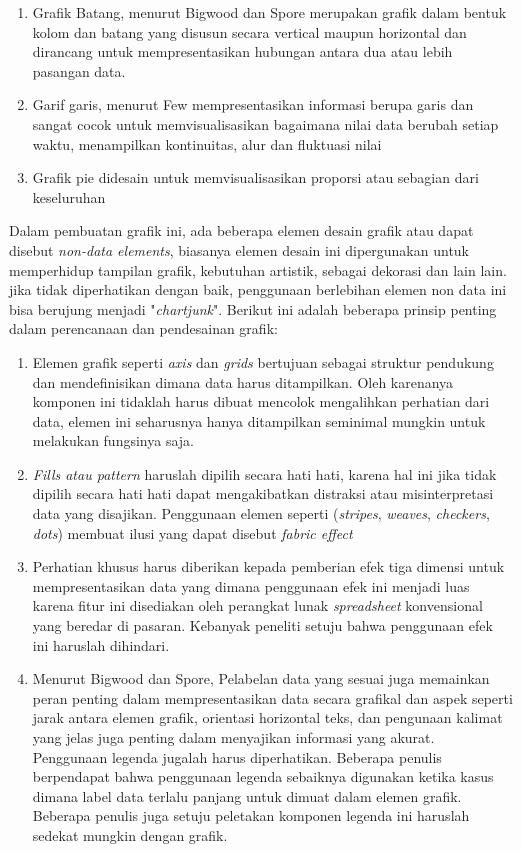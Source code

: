 \begin{enumerate}
	\item{Grafik Batang, menurut Bigwood dan Spore merupakan grafik dalam bentuk kolom dan batang yang disusun secara vertical maupun horizontal dan dirancang untuk mempresentasikan hubungan antara dua atau lebih pasangan data.}
	\item{Garif garis, menurut Few mempresentasikan informasi berupa garis dan sangat cocok untuk memvisualisasikan bagaimana nilai data berubah setiap waktu, menampilkan kontinuitas, alur dan fluktuasi nilai}
	\item{Grafik pie didesain untuk memvisualisasikan proporsi atau sebagian dari keseluruhan}
\end{enumerate}

Dalam pembuatan grafik ini, ada beberapa elemen desain grafik atau dapat disebut \textit{non-data elements}, biasanya elemen desain ini dipergunakan untuk memperhidup tampilan grafik, kebutuhan artistik, sebagai dekorasi dan lain lain. jika tidak diperhatikan dengan baik, penggunaan berlebihan elemen non data ini bisa berujung menjadi "\textit{chartjunk}". Berikut ini adalah beberapa prinsip penting dalam perencanaan dan pendesainan grafik: \citep{datavisualization1}
\begin{enumerate}
	\item {Elemen grafik seperti \textit{axis} dan \textit{grids} bertujuan sebagai struktur pendukung dan mendefinisikan dimana data harus ditampilkan. Oleh karenanya komponen ini tidaklah harus dibuat mencolok mengalihkan perhatian dari data, elemen ini seharusnya hanya ditampilkan seminimal mungkin untuk melakukan fungsinya saja.}
	\item{\textit{Fills atau pattern} haruslah dipilih secara hati hati, karena hal ini jika tidak dipilih secara hati hati dapat mengakibatkan distraksi atau misinterpretasi data yang disajikan. Penggunaan elemen seperti (\textit{stripes}, \textit{weaves}, \textit{checkers}, \textit{dots}) membuat ilusi yang dapat disebut \textit{fabric effect} }
	\item {Perhatian khusus harus diberikan kepada pemberian efek tiga dimensi untuk mempresentasikan data yang dimana penggunaan efek ini menjadi luas karena fitur ini disediakan oleh perangkat lunak \textit{spreadsheet} konvensional yang beredar di pasaran. Kebanyak peneliti setuju bahwa penggunaan efek ini haruslah dihindari.}
	\item {Menurut Bigwood dan Spore, Pelabelan data yang sesuai juga memainkan peran penting dalam mempresentasikan data secara grafikal dan aspek seperti jarak antara elemen grafik, orientasi horizontal teks, dan pengunaan kalimat yang jelas juga penting dalam menyajikan informasi yang akurat. Penggunaan legenda jugalah harus diperhatikan. Beberapa penulis berpendapat bahwa penggunaan legenda sebaiknya digunakan ketika kasus dimana label data terlalu panjang untuk dimuat dalam elemen grafik. Beberapa penulis juga setuju peletakan komponen legenda ini haruslah sedekat mungkin dengan grafik. }
\end{enumerate}


